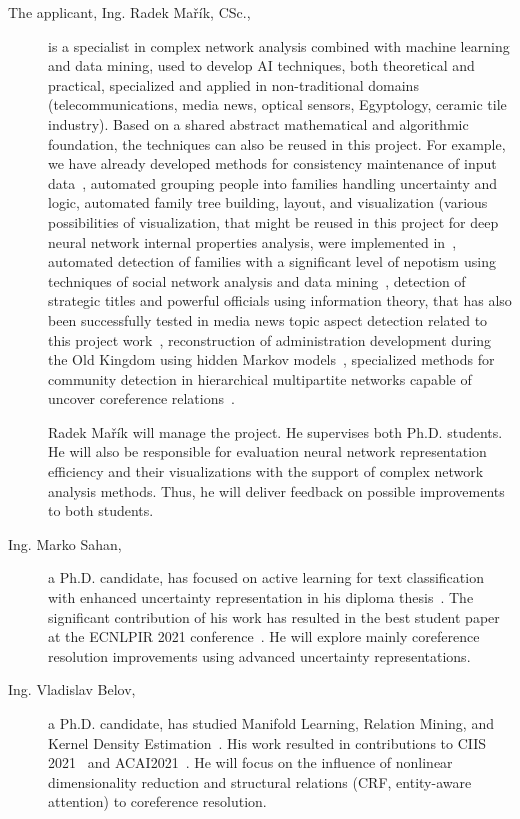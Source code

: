 \begin{description}
	\item [The applicant, Ing. Radek Mařík, CSc.,]  is a specialist in complex network analysis combined with machine learning and data mining, used to develop AI techniques, both theoretical and practical, specialized and applied in non-traditional domains (telecommunications, media news, optical sensors, Egyptology, ceramic tile industry). Based on a shared abstract mathematical and algorithmic foundation, the techniques can also be reused in this project. For example, we have already developed methods for consistency maintenance of input data~\cite{Marik2016c}, automated grouping people into families handling uncertainty and logic, automated family tree building, layout, and visualization (various possibilities of visualization, that might be reused in this project for deep neural network internal properties analysis, were implemented in~\cite{Marik2016,Marik2016b,Marik2017d,Marik2017,Marik2018a,Marik2019a}, automated detection of families with a significant level of nepotism using techniques of social network analysis and data mining~\cite{Dulikova2015,Dulikova2017b}, detection of strategic titles and powerful officials using information theory, that has also been successfully tested in media news topic aspect detection related to this project work~\cite{Marik2018c}, reconstruction of administration development during the Old Kingdom using hidden Markov models~\cite{Dulikova2017b,Marik2017e}, specialized methods for community detection in hierarchical multipartite networks capable of uncover coreference relations~\cite{Marik2018d,Belov2020,Zikmund2020}. 
	
Radek Mařík will manage the project. He supervises both Ph.D. students. He will also be responsible for evaluation neural network representation efficiency and their visualizations with the support of complex network analysis methods. Thus, he will deliver feedback on possible improvements to both students.

\item [Ing. Marko Sahan,] a Ph.D. candidate, has focused on active learning for text classification with enhanced uncertainty representation in his diploma thesis~\cite{Sahan2020}. The significant contribution of his work has resulted in the best student paper at the ECNLPIR 2021 conference~\cite{sahan2021active}. He will explore mainly coreference resolution improvements using advanced uncertainty representations.

\item [Ing. Vladislav Belov,] a Ph.D. candidate, has studied Manifold Learning, Relation Mining, and Kernel Density Estimation~\cite{Belov2020}. His work resulted in contributions to CIIS 2021~\cite{Belov2021ML} and ACAI2021~\cite{Belov2021KDE}. He will focus on the influence of nonlinear dimensionality reduction and structural relations (CRF, entity-aware attention) to coreference resolution.

\end{description}

